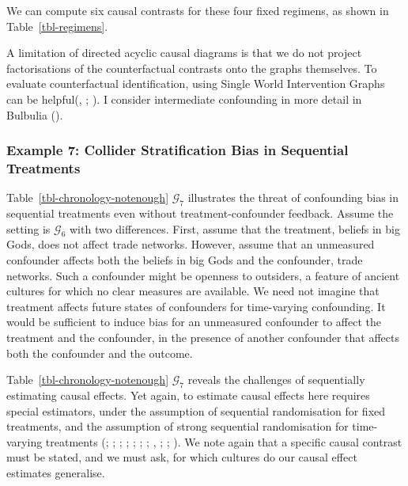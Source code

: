 \documentclass[
  single column]{article}
\begin{document}
We can compute six causal contrasts for these four fixed regimens, as
shown in Table~\ref{tbl-regimens}.

A limitation of directed acyclic causal diagrams is that we do not
project factorisations of the counterfactual contrasts onto the graphs
themselves. To evaluate counterfactual identification, using Single
World Intervention Graphs can be
helpful(, ;
).
I consider intermediate confounding in more detail in Bulbulia
().

\subsubsection{Example 7: Collider Stratification Bias in Sequential
Treatments}\label{example-7-collider-stratification-bias-in-sequential-treatments}

Table~\ref{tbl-chronology-notenough} \(\mathcal{G}_7\) illustrates the
threat of confounding bias in sequential treatments even without
treatment-confounder feedback. Assume the setting is \(\mathcal{G}_6\)
with two differences. First, assume that the treatment, beliefs in big
Gods, does not affect trade networks. However, assume that an unmeasured
confounder affects both the beliefs in big Gods and the confounder,
trade networks. Such a confounder might be openness to outsiders, a
feature of ancient cultures for which no clear measures are available.
We need not imagine that treatment affects future states of confounders
for time-varying confounding. It would be sufficient to induce bias for
an unmeasured confounder to affect the treatment and the confounder, in
the presence of another confounder that affects both the confounder and
the outcome.

Table~\ref{tbl-chronology-notenough} \(\mathcal{G}_7\) reveals the
challenges of sequentially estimating causal effects. Yet again, to
estimate causal effects here requires special estimators, under the
assumption of sequential randomisation for fixed treatments, and the
assumption of strong sequential randomisation for time-varying
treatments (;
;
;
;
;
;
;
,
;
;
). We note
again that a specific causal contrast must be stated, and we must ask,
for which cultures do our causal effect estimates generalise.
\end{document}
